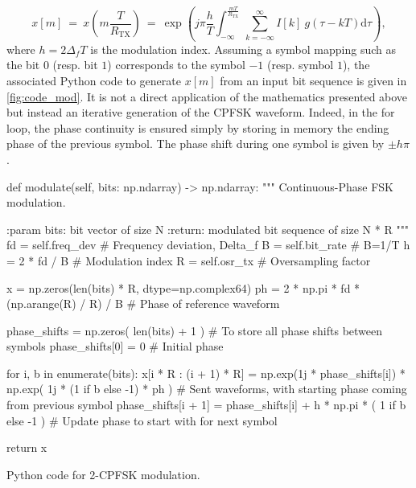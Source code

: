 \begin{equation*}
    x[m] \:=\:x\left(m\frac{T}{R_{\text{TX}}}\right)\:=\:\exp \left(j\pi \frac{h}{T} \int_{-\infty}^{\frac{mT}{R_{\text{TX}}}} \sum_{k=-\infty}^{\infty}I[k]\:g(\tau-kT) \text{d}\tau \right),
\end{equation*}
where $h=2 \Delta_f T$ is the modulation index.
Assuming a symbol mapping such as the bit $0$ (resp. bit $1$) corresponds to the symbol $-1$ (resp. symbol $1$), the associated Python code to generate $x[m]$ from an input bit sequence is given in \autoref{fig:code_mod}. It is not a direct application of the mathematics presented above but instead an iterative generation of the CPFSK waveform. Indeed, in the for loop, the phase continuity is ensured simply by storing in memory the ending phase of the previous symbol. The phase shift during one symbol is given by $\pm h\pi$.

\begin{listing}[H]
    \begin{python}
    def modulate(self, bits: np.ndarray) -> np.ndarray:
        """
        Continuous-Phase FSK modulation.

        :param bits: bit vector of size N
        :return: modulated bit sequence of size N * R
        """
        fd = self.freq_dev  # Frequency deviation, Delta_f
        B = self.bit_rate  # B=1/T
        h = 2 * fd / B  # Modulation index
        R = self.osr_tx  # Oversampling factor

        x = np.zeros(len(bits) * R, dtype=np.complex64)
        ph = 2 * np.pi * fd * (np.arange(R) / R) / B  # Phase of reference waveform

        phase_shifts = np.zeros(
            len(bits) + 1
        )  # To store all phase shifts between symbols
        phase_shifts[0] = 0  # Initial phase

        for i, b in enumerate(bits):
            x[i * R : (i + 1) * R] = np.exp(1j * phase_shifts[i]) * np.exp(
                1j * (1 if b else -1) * ph
            )  # Sent waveforms, with starting phase coming from previous symbol
            phase_shifts[i + 1] = phase_shifts[i] + h * np.pi * (
                1 if b else -1
            )  # Update phase to start with for next symbol

        return x
\end{python}
\caption{Python code for 2-CPFSK modulation.}
\label{fig:code_mod}
\end{listing}



